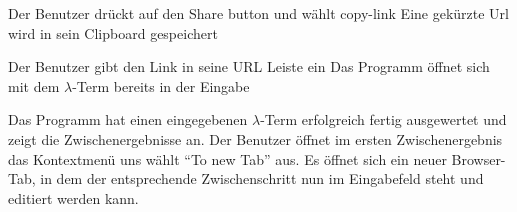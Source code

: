 \documentclass[parskip=full,11pt,twoside]{scrartcl}
\begin{document}
{ Der Benutzer drückt auf den Share button und wählt copy-link}
{ Eine gekürzte Url wird in sein Clipboard gespeichert }

{Der Benutzer gibt den Link in seine URL Leiste ein }
{ Das Programm öffnet sich mit dem $\lambda$-Term bereits in der Eingabe }



\teststep
{Das Programm hat einen eingegebenen $\lambda$-Term erfolgreich fertig ausgewertet und zeigt die Zwischenergebnisse an.}
{Der Benutzer öffnet im ersten Zwischenergebnis das Kontextmenü uns wählt \enquote{To new Tab} aus.}
{Es öffnet sich ein neuer Browser-Tab, in dem der entsprechende Zwischenschritt nun im Eingabefeld steht und editiert werden kann.}





\newpage
\end{document}
